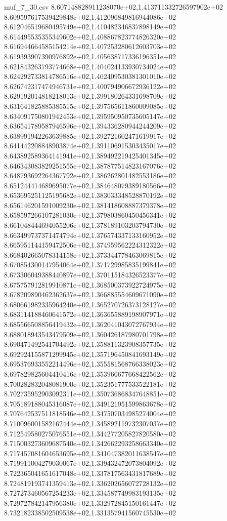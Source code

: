 \begin{filecontents*}{muf_7_30.csv}
8.607148828911238070e+02,1.413711332726597902e+02
8.609597617539429848e+02,1.412096849816944086e+02
8.612046519680495749e+02,1.410482346837898149e+02
8.614495535355349602e+02,1.408867823774826320e+02
8.616944664585154214e+02,1.407253280612603703e+02
8.619393907390976892e+02,1.405638717336196351e+02
8.621843263793774668e+02,1.404024133930734024e+02
8.624292733814786516e+02,1.402409530381301010e+02
8.626742317474946731e+02,1.400794906672936122e+02
8.629192014818218013e+02,1.399180264331698709e+02
8.631641825885385515e+02,1.397565611860009085e+02
8.634091750801942453e+02,1.395950950735605147e+02
8.636541789587946596e+02,1.394336280944244209e+02
8.638991942263639885e+02,1.392721602471619917e+02
8.641442208848903874e+02,1.391106915303435017e+02
8.643892589364141941e+02,1.389492219425401345e+02
8.646343083829251555e+02,1.387877514823167076e+02
8.648793692264367792e+02,1.386262801482553186e+02
8.651244414689695077e+02,1.384648079389180566e+02
8.653695251125195682e+02,1.383033348528870192e+02
8.656146201591009230e+02,1.381418608887379378e+02
8.658597266107281030e+02,1.379803860450456341e+02
8.661048444694055206e+02,1.378189103203794730e+02
8.663499737371474794e+02,1.376574337133160952e+02
8.665951144159472506e+02,1.374959562224312322e+02
8.668402665078314158e+02,1.373344778463069815e+02
8.670854300147954064e+02,1.371729985835199841e+02
8.673306049388440897e+02,1.370115184326523377e+02
8.675757912819910871e+02,1.368500373922724975e+02
8.678209890462362637e+02,1.366885554609671090e+02
8.680661982335964240e+02,1.365270726373128127e+02
8.683114188460641572e+02,1.363655889198907971e+02
8.685566508856419432e+02,1.362041043072767934e+02
8.688018943543479509e+02,1.360426187980701798e+02
8.690471492541704492e+02,1.358811323908357735e+02
8.692924155871299945e+02,1.357196450841693149e+02
8.695376933552214496e+02,1.355581568766338023e+02
8.697829825604410416e+02,1.353966677668422562e+02
8.700282832048081900e+02,1.352351777533522181e+02
8.702735952903092311e+02,1.350736868347648851e+02
8.705189188045316087e+02,1.349121951599863678e+02
8.707642537511818546e+02,1.347507034985274004e+02
8.710096001582162444e+02,1.345892119732307037e+02
8.712549580275076551e+02,1.344277205827820580e+02
8.715003273609687540e+02,1.342662293258663340e+02
8.717457081604653695e+02,1.341047382011638547e+02
8.719911004279030067e+02,1.339432472073804092e+02
8.722365041651617048e+02,1.337817563431817689e+02
8.724819193741359413e+02,1.336202656072728132e+02
8.727273460567254233e+02,1.334587749983193135e+02
8.729727842147956380e+02,1.332972845150161447e+02
8.732182338502509538e+02,1.331357941560745530e+02

\end{filecontents*}
